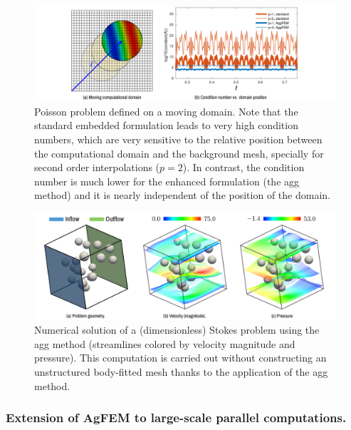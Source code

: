 \documentclass{article}
\begin{document}
\begin{figure}[ht!]
\includegraphics[width=\textwidth]{../_assets/fig3.png}
\caption{Poisson problem defined on a moving domain. Note that the standard embedded formulation leads to very high condition numbers, which are very sensitive to the relative position between the computational domain and the background mesh, specially for second order interpolations ($p=2$). In contrast, the condition number is much lower for the enhanced formulation (the \ac{agg} method) and it is nearly independent of the position of the domain.}
\label{fig:aggfem}
\end{figure}


\begin{figure}[ht!]
\includegraphics[width=\textwidth]{../_assets/fig4.png}
  \caption{Numerical solution of a (dimensionless) Stokes problem using the \ac{agg} method (streamlines colored by velocity magnitude and pressure). This computation is carried out without constructing an unstructured body-fitted mesh thanks to the application of the \ac{agg} method.}
  \label{fig:complex-case1-sol}
\end{figure}



\subsubsection{Extension of AgFEM to large-scale parallel computations.}
\end{document}
